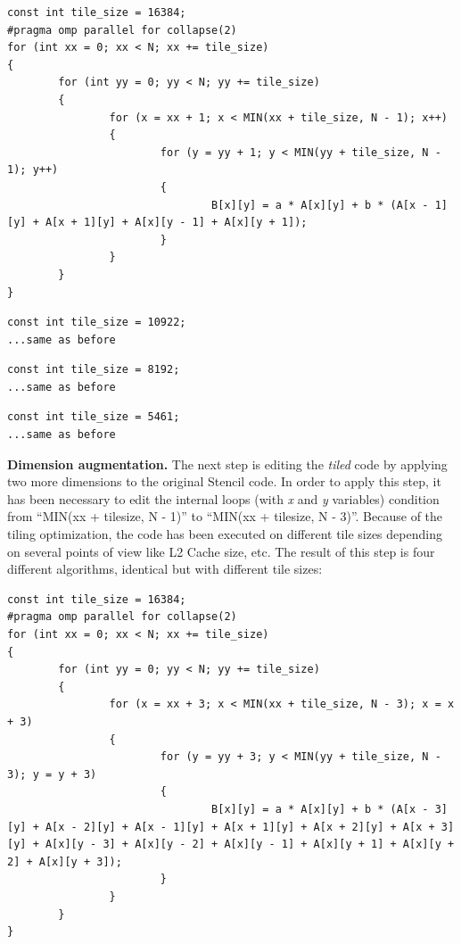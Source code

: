 \documentclass[conference]{IEEEtran}
\newcommand{\mypar}[1]{{\bf #1.}}
\begin{document}
\renewcommand{\lstlistingname}{Algorithm}

\begin{lstlisting}[caption={Loop tiling with size of 16384},label={lst:tiling-1}]
const int tile_size = 16384;
#pragma omp parallel for collapse(2)
for (int xx = 0; xx < N; xx += tile_size)
{
		for (int yy = 0; yy < N; yy += tile_size)
		{
				for (x = xx + 1; x < MIN(xx + tile_size, N - 1); x++)
				{
						for (y = yy + 1; y < MIN(yy + tile_size, N - 1); y++)
						{
								B[x][y] = a * A[x][y] + b * (A[x - 1][y] + A[x + 1][y] + A[x][y - 1] + A[x][y + 1]);
						}
				}
		}
}
\end{lstlisting}

\begin{lstlisting}[caption={Loop tiling with size of 10922},label={lst:tiling-2}]
const int tile_size = 10922;
...same as before
\end{lstlisting}

\begin{lstlisting}[caption={Loop tiling with size of 8192},label={lst:tiling-3}]
const int tile_size = 8192;
...same as before
\end{lstlisting} 

\begin{lstlisting}[caption={Loop tiling with size of 5461},label={lst:tiling-4}]
const int tile_size = 5461;
...same as before
\end{lstlisting}

\mypar{Dimension augmentation}
The next step is editing the \textit{tiled} code by applying two more dimensions to the original Stencil code. In order to apply this step, it has been necessary to edit the internal loops (with \textit{x} and \textit{y} variables) condition from ``MIN(xx + tile\textunderscore size, N - 1)'' to ``MIN(xx + tile\textunderscore size, N - 3)''. Because of the tiling optimization, the code has been executed on different tile sizes depending on several points of view like L2 Cache size, etc. The result of this step is four different algorithms, identical but with different tile sizes:

\renewcommand{\lstlistingname}{Algorithm}

\begin{lstlisting}[caption={Dimension augmentation + loop tiling with size of 16384},label={lst:augmentation-1}]
const int tile_size = 16384;
#pragma omp parallel for collapse(2)
for (int xx = 0; xx < N; xx += tile_size)
{
		for (int yy = 0; yy < N; yy += tile_size)
		{
				for (x = xx + 3; x < MIN(xx + tile_size, N - 3); x = x + 3)
				{
						for (y = yy + 3; y < MIN(yy + tile_size, N - 3); y = y + 3)
						{
								B[x][y] = a * A[x][y] + b * (A[x - 3][y] + A[x - 2][y] + A[x - 1][y] + A[x + 1][y] + A[x + 2][y] + A[x + 3][y] + A[x][y - 3] + A[x][y - 2] + A[x][y - 1] + A[x][y + 1] + A[x][y + 2] + A[x][y + 3]);
						}
				}
		}
}
\end{lstlisting}
\end{document}
